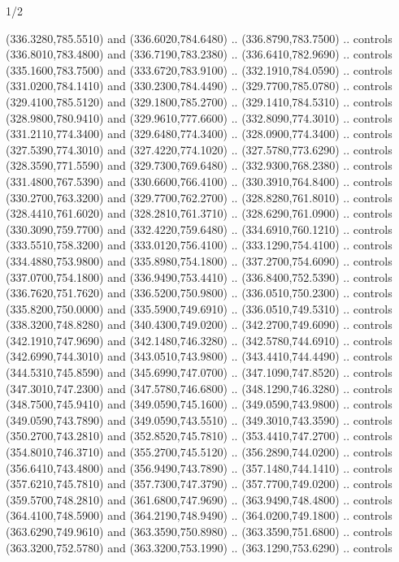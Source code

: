\begin{flagdescription}{1/2}
\begin{scope}[xshift=0.5\flaglength]
\begin{scope}[scale=0.00745\flagwidth,xshift=-12.1mm,yshift=41.7mm]
\begin{scope}[y=0.80pt, x=0.80pt, yscale=-1, xscale=1, inner sep=0pt, outer sep=0pt]
\begin{scope}[cm={{1.33333,0.0,0.0,-1.33333,(0.0,114.66667)}}]
\begin{scope}[scale=0.100]
  (336.3280,785.5510) and (336.6020,784.6480) .. (336.8790,783.7500) .. controls
  (336.8010,783.4800) and (336.7190,783.2380) .. (336.6410,782.9690) .. controls
  (335.1600,783.7500) and (333.6720,783.9100) .. (332.1910,784.0590) .. controls
  (331.0200,784.1410) and (330.2300,784.4490) .. (329.7700,785.0780) .. controls
  (329.4100,785.5120) and (329.1800,785.2700) .. (329.1410,784.5310) .. controls
  (328.9800,780.9410) and (329.9610,777.6600) .. (332.8090,774.3010) .. controls
  (331.2110,774.3400) and (329.6480,774.3400) .. (328.0900,774.3400) .. controls
  (327.5390,774.3010) and (327.4220,774.1020) .. (327.5780,773.6290) .. controls
  (328.3590,771.5590) and (329.7300,769.6480) .. (332.9300,768.2380) .. controls
  (331.4800,767.5390) and (330.6600,766.4100) .. (330.3910,764.8400) .. controls
  (330.2700,763.3200) and (329.7700,762.2700) .. (328.8280,761.8010) .. controls
  (328.4410,761.6020) and (328.2810,761.3710) .. (328.6290,761.0900) .. controls
  (330.3090,759.7700) and (332.4220,759.6480) .. (334.6910,760.1210) .. controls
  (333.5510,758.3200) and (333.0120,756.4100) .. (333.1290,754.4100) .. controls
  (334.4880,753.9800) and (335.8980,754.1800) .. (337.2700,754.6090) .. controls
  (337.0700,754.1800) and (336.9490,753.4410) .. (336.8400,752.5390) .. controls
  (336.7620,751.7620) and (336.5200,750.9800) .. (336.0510,750.2300) .. controls
  (335.8200,750.0000) and (335.5900,749.6910) .. (336.0510,749.5310) .. controls
  (338.3200,748.8280) and (340.4300,749.0200) .. (342.2700,749.6090) .. controls
  (342.1910,747.9690) and (342.1480,746.3280) .. (342.5780,744.6910) .. controls
  (342.6990,744.3010) and (343.0510,743.9800) .. (343.4410,744.4490) .. controls
  (344.5310,745.8590) and (345.6990,747.0700) .. (347.1090,747.8520) .. controls
  (347.3010,747.2300) and (347.5780,746.6800) .. (348.1290,746.3280) .. controls
  (348.7500,745.9410) and (349.0590,745.1600) .. (349.0590,743.9800) .. controls
  (349.0590,743.7890) and (349.0590,743.5510) .. (349.3010,743.3590) .. controls
  (350.2700,743.2810) and (352.8520,745.7810) .. (353.4410,747.2700) .. controls
  (354.8010,746.3710) and (355.2700,745.5120) .. (356.2890,744.0200) .. controls
  (356.6410,743.4800) and (356.9490,743.7890) .. (357.1480,744.1410) .. controls
  (357.6210,745.7810) and (357.7300,747.3790) .. (357.7700,749.0200) .. controls
  (359.5700,748.2810) and (361.6800,747.9690) .. (363.9490,748.4800) .. controls
  (364.4100,748.5900) and (364.2190,748.9490) .. (364.0200,749.1800) .. controls
  (363.6290,749.9610) and (363.3590,750.8980) .. (363.3590,751.6800) .. controls
  (363.3200,752.5780) and (363.3200,753.1990) .. (363.1290,753.6290) .. controls

\end{scope}
\end{scope}
\end{scope}
\end{scope}
\end{scope}
\end{flagdescription}
